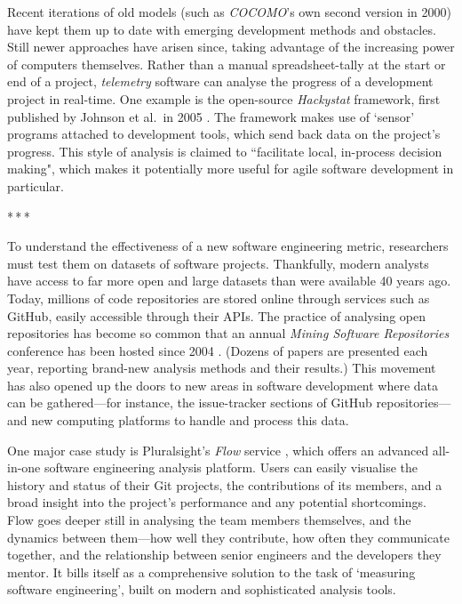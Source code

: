 \documentclass[12pt]{article}
\newcommand{\parbreak}{\bigskip\par\centerline{*\,*\,*}\medskip\par}
\begin{document}
	Recent iterations of old models (such as \textit{COCOMO}'s own second version in 2000) have kept them up to date with emerging development methods and obstacles. Still newer approaches have arisen since, taking advantage of the increasing power of computers themselves. Rather than a manual spreadsheet-tally at the start or end of a project, \textit{telemetry} software can analyse the progress of a development project in real-time. One example is the open-source \textit{Hackystat} framework, first published by Johnson et al.\ in 2005 \cite{telemetry}. The framework makes use of `sensor' programs attached to development tools, which send back data on the project's progress. This style of analysis is claimed to ``facilitate local, in-process decision making", which makes it potentially more useful for agile software development in particular.
	
	\parbreak
	
	To understand the effectiveness of a new software engineering metric, researchers must test them on datasets of software projects. Thankfully, modern analysts have access to far more open and large datasets than were available 40 years ago. Today, millions of code repositories are stored online through services such as GitHub, easily accessible through their APIs. The practice of analysing open repositories has become so common that an annual \textit{Mining Software Repositories} conference has been hosted since 2004 \cite{msr}. (Dozens of papers are presented each year, reporting brand-new analysis methods and their results.) This movement has also opened up the doors to new areas in software development where data can be gathered---for instance, the issue-tracker sections of GitHub repositories---and new computing platforms to handle and process this data.
	
	One major case study is Pluralsight's \textit{Flow} service \cite{flow}, which offers an advanced all-in-one software engineering analysis platform. Users can easily visualise the history and status of their Git projects, the contributions of its members, and a broad insight into the project's performance and any potential shortcomings. Flow goes deeper still in analysing the team members themselves, and the dynamics between them---how well they contribute, how often they communicate together, and the relationship between senior engineers and the developers they mentor. It bills itself as a comprehensive solution to the task of `measuring software engineering', built on modern and sophisticated analysis tools.
	
\end{document}
